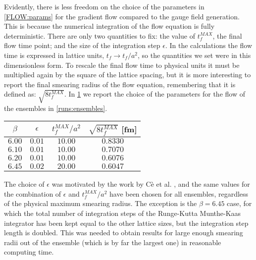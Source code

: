 Evidently, there is less freedom on the choice of the parameters in \cref{FLOW:params} for the gradient flow compared to the gauge field generation. This is because the numerical integration of the flow equation is fully deterministic. There are only two quantities to fix: the value of $t_f^{MAX}$, the final flow time point; and the size of the integration step $\epsilon$. In the calculations the flow time is expressed in lattice units, $t_f \rightarrow t_f/a^2$, so the quantities we set were in this dimensionless form. To rescale the final flow time to physical units it must be multiplied again by the square of the lattice spacing, but it is more interesting to report the final smearing radius of the flow equation, remembering that it is defined as: $\sqrt{8t_f^{MAX}}$. In \cref{runs:flow} we report the choice of the parameters for the flow of the ensembles in \cref{runs:ensembles}.
 
\begin{table}[!htb]
    \begin{center}
    \begin{tabular}{cccc} 
        $\beta$ & $\epsilon$ & $t_f^{MAX}/a^2$ & $\sqrt{8t_f^{MAX}}$ [fm] \\\hline
        $6.00$ & $0.01$ & $10.00$ & $0.8330$ \\
        $6.10$ & $0.01$ & $10.00$ & $0.7070$ \\
        $6.20$ & $0.01$ & $10.00$ & $0.6076$ \\
        $6.45$ & $0.02$ & $20.00$ & $0.6047$ 
    \end{tabular}
    \label{runs:flow} 
    \end{center}
\end{table}
The choice of $\epsilon$ was motivated by the work by C\`{e} et al. \cite{ce_testing_2015}, and the same values for the combination of $\epsilon$ and $t_f^{MAX}/a^2$ have been chosen for all ensembles, regardless of the physical maximum smearing radius. The exception is the $\beta=6.45$ case, for which the total number of integration steps of the Runge-Kutta Munthe-Kaas integrator has been kept equal to the other lattice sizes, but the integration step length is doubled. This was needed to obtain results for large enough smearing radii out of the ensemble (which is by far the largest one) in reasonable computing time.


